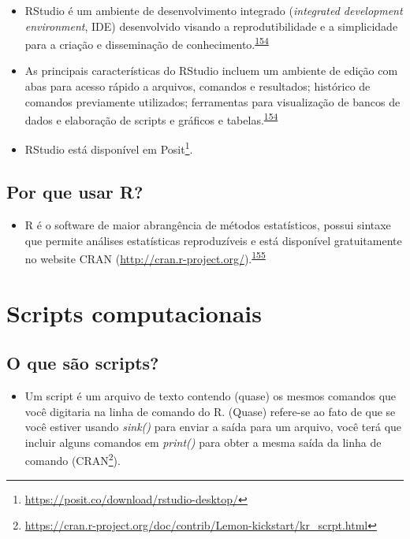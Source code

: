 \documentclass[
]{book}
\providecommand{\tightlist}{%
  \setlength{\itemsep}{0pt}\setlength{\parskip}{0pt}}
\renewcommand{\href}[2]{#2\footnote{\url{#1}}}
\begin{document}
\begin{itemize}
\item
  RStudio é um ambiente de desenvolvimento integrado (\emph{integrated development environment}, IDE) desenvolvido visando a reprodutibilidade e a simplicidade para a criação e disseminação de conhecimento.\textsuperscript{\protect\hyperlink{ref-racine2011}{154}}
\item
  As principais características do RStudio incluem um ambiente de edição com abas para acesso rápido a arquivos, comandos e resultados; histórico de comandos previamente utilizados; ferramentas para visualização de bancos de dados e elaboração de scripts e gráficos e tabelas.\textsuperscript{\protect\hyperlink{ref-racine2011}{154}}
\item
  RStudio está disponível em \href{https://posit.co/download/rstudio-desktop/}{Posit}.
\end{itemize}

\hypertarget{por-que-usar-r}{%
\subsection{Por que usar R?}\label{por-que-usar-r}}

\begin{itemize}
\tightlist
\item
  R é o software de maior abrangência de métodos estatísticos, possui sintaxe que permite análises estatísticas reproduzíveis e está disponível gratuitamente no website CRAN (\url{http://cran.r-project.org/}).\textsuperscript{\protect\hyperlink{ref-mair2016}{155}}
\end{itemize}

\hypertarget{scripts-computacionais}{%
\section{Scripts computacionais}\label{scripts-computacionais}}

\hypertarget{o-que-suxe3o-scripts}{%
\subsection{O que são scripts?}\label{o-que-suxe3o-scripts}}

\begin{itemize}
\tightlist
\item
  Um script é um arquivo de texto contendo (quase) os mesmos comandos que você digitaria na linha de comando do R. (Quase) refere-se ao fato de que se você estiver usando \emph{sink()} para enviar a saída para um arquivo, você terá que incluir alguns comandos em \emph{print()} para obter a mesma saída da linha de comando (\href{https://cran.r-project.org/doc/contrib/Lemon-kickstart/kr_scrpt.html}{CRAN}).
\end{itemize}
\end{document}
